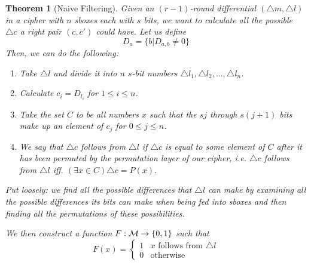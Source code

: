 \documentclass[12pt,a4paper]{article}
\newtheorem{theorem}{Theorem}
\begin{document}
\begin{theorem}[Naive Filtering]
Given an $(r-1)$-round differential $(\triangle m,\triangle l)$ in a cipher
with $n$ sboxes each with $s$ bits, we want to calculate all the possible
$\triangle c$ a right pair $(c,c')$ could have. Let us define
\[D_a = \{b | D_{a,b} \neq 0\}\]
Then, we can do the following:

\begin{enumerate}
    \item Take $\triangle l$ and divide it into $n$ $s$-bit numbers $\triangle
    l_1,\triangle l_2, \ldots, \triangle l_n$. 
    \item Calculate $c_i = D_{l_i}$ for $1 \leq i \leq n$. 
    \item Take the set $C$ to be all numbers $x$ such that the $sj$ through
    $s(j+1)$ bits make up an element of $c_j$ for $0 \leq j \leq n$.
    \item We say that $\triangle c$ follows from $\triangle l$ if $\triangle c$
    is equal to some element of $C$ after it has been permuted by the
    permutation layer of our cipher, i.e. $\triangle c$ follows from $\triangle
    l$ iff. $(\exists x \in C) \triangle c = P(x)$.
\end{enumerate}

Put loosely: we find all the possible differences that $\triangle l$ can make
by examining all the possible differences its bits can make when being fed into
sboxes and then finding all the permutations of these possibilities.

We then construct a function $F: {\cal{M}} \rightarrow \{0,1\}$ such that
\[F(x) = \begin{cases}1 & x \mbox{ follows from } \triangle l \\ 0 &
\mbox{otherwise} \end{cases}\]
\end{theorem}
\end{document}
